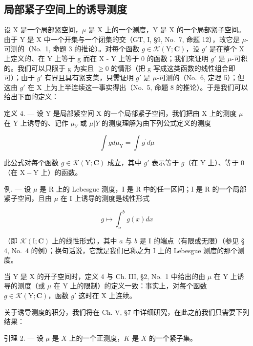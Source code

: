 \subsection{局部紧子空间上的诱导测度}

设 X 是一个局部紧空间，\(\mu\) 是 X 上的一个测度，Y 是 X 的一个局部紧子空间。由于 Y 是 X 中一个开集与一个闭集的交（GT, I, §9, No.~7, 命题 12），故它是 \(\mu\)-可测的（No.~1, 命题 3 的推论）。对每个函数 \(g \in \mathcal{K}(\mathrm{Y};\mathbf{C})\)，设 \(g'\) 是在整个 X 上定义的、在 Y 上等于 g 而在 X - Y 上等于 0 的函数；我们来证明 \(g'\) 是 \(\mu\)-可积的。我们可以只限于 g 为实且 \(\geqslant 0\) 的情形（把 g 写成这类函数的线性组合即可）；由于 \(g'\) 有界且具有紧支集，只需证明 \(g'\) 是 \(\mu\)-可测的（No.~6, 定理 5）；但这由 \(g'\) 在 X 上为上半连续这一事实得出（No.~5, 命题 8 的推论）。于是我们可以给出下面的定义：

定义 4. --- 设 Y 是局部紧空间 X 的一个局部紧子空间，我们把由 X 上的测度 \(\mu\) 在 Y 上诱导的、记作 \(\mu_{Y}\) 或 \(\mu|Y\) 的测度理解为由下列公式定义的测度

\[
\int g d \mu_ {\mathrm{Y}} = \int g ^ {\prime} d \mu\tag{1}
\]

此公式对每个函数 \(g \in \mathcal{K}(\mathrm{Y};\mathbf{C})\) 成立，其中 \(g'\) 表示等于 \(g\)（在 \(\mathrm{Y}\) 上）、等于 0（在 \(\mathrm{X} - \mathrm{Y}\) 上）的函数。

例. --- 设 \(\mu\) 是 R 上的 Lebesgue 测度，I 是 R 中的任一区间；I 是 R 的一个局部紧子空间，且由 \(\mu\) 在 I 上诱导的测度是线性形式

\[
g \mapsto \int_ {a} ^ {b} g (x) d x
\]

（即 \(\mathcal{K}(\mathrm{I};\mathbf{C})\) 上的线性形式），其中 \(a\) 与 \(b\) 是 I 的端点（有限或无限）（参见 § 4, No.~4 的例）；换句话说，它就是我们已称之为 I 上的 Lebesgue 测度的那个测度。

当 Y 是 X 的开子空间时，定义 4 与 Ch. III, §2, No.~1 中给出的由 \(\mu\) 在 Y 上诱导的测度（或 \(\mu\) 在 Y 上的限制）的定义一致：事实上，对每个函数 \(g \in \mathcal{K}(\mathrm{Y}; \mathbf{C})\)，函数 \(g'\) 这时在 X 上连续。

关于诱导测度的积分，我们将在 Ch. V, §7 中详细研究，在此之前我们只需要下列结果：

引理 2. --- 设 \(\mu\) 是 \(X\) 上的一个正测度，\(K\) 是 \(X\) 的一个紧子集。


